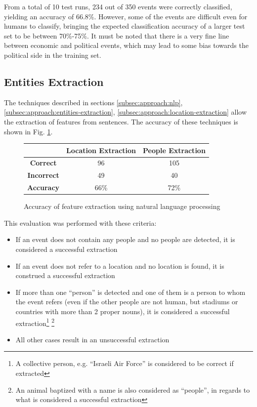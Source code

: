 \documentclass{llncs}
\begin{document}
From a total of 10 test runs, 234 out of 350 events were correctly classified, yielding an accuracy of 66.8\%. However, some of the events are difficult even for humans to classify, bringing the expected classification accuracy of a larger test set to be between 70\%-75\%. It must be noted that there is a very fine line between economic and political events, which may lead to some bias towards the political side in the training set.

\subsection{Entities Extraction}

The techniques described in sections \ref{subsec:approach:nlp}, \ref{subsec:approach:entities-extraction}, \ref{subsec:approach:location-extraction} allow the extraction of features from sentences. The accuracy of these techniques is shown in Fig. \ref{fig:feature-extraction-accuracy}.

\begin{figure}[h!]
	\centering
	\begin{tabular}{c|c|c}
		& \textbf{Location Extraction} & \textbf{People Extraction} \\
		\hline
		\textbf{Correct}   & 96 & 105 \\
		\textbf{Incorrect} & 49 & 40 \\
		\hline
		\textbf{Accuracy}  & 66\% & 72\% \\ 
	\end{tabular}
	\caption{Accuracy of feature extraction using natural language processing}
	\label{fig:feature-extraction-accuracy}
\end{figure}

This evaluation was performed with these criteria:

\begin{itemize}
	\item If an event does not contain any people and no people are detected, it is considered a successful extraction
	\item If an event does not refer to a location and no location is found, it is construed a successful extraction
	\item If more than one ``person'' is detected and one of them is a person to whom the event refers (even if the other people are not human, but stadiums or countries with more than 2 proper nouns), it is considered a successful extraction\footnote{A collective person, e.g. ``Israeli Air Force'' is considered to be correct if extracted} \footnote{An animal baptized with a name is also considered as ``people'', in regards to what is considered a successful extraction}
	\item All other cases result in an unsuccessful extraction
\end{itemize}
\end{document}

